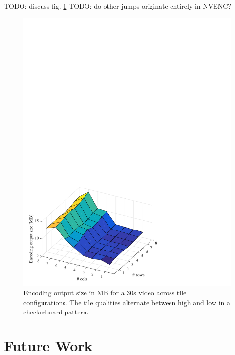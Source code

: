 TODO: discuss fig. \ref{fig:size}
TODO: do other jumps originate entirely in NVENC?






\begin{figure}[t]
	\includegraphics[width=\columnwidth]{figures/sizes_v1.pdf}
	\caption{Encoding output size in MB for a 30s video across tile configurations. The tile qualities alternate between high and low in a checkerboard pattern. }
	\label{fig:size}
\end{figure}



\section{Future Work}

